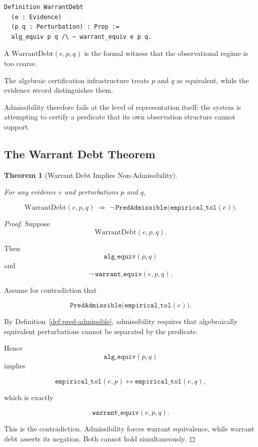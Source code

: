 \documentclass[12pt]{article}
\theoremstyle{plain}
\newtheorem{theorem}{Theorem}[section]
\theoremstyle{definition}
\theoremstyle{remark}
\newcommand{\WD}{\mathrm{WarrantDebt}}
\begin{document}
\begin{lstlisting}[style=rocq,
caption={Warrant debt.}]
Definition WarrantDebt
  (e : Evidence)
  (p q : Perturbation) : Prop :=
  alg_equiv p q /\ ~ warrant_equiv e p q.
\end{lstlisting}

A $\WD(e,p,q)$ is the formal witness that the observational regime is
too coarse.

The algebraic certification infrastructure treats $p$ and $q$ as
equivalent, while the evidence record distinguishes them.

Admissibility therefore fails at the level of representation itself:
the system is attempting to certify a predicate that its own
observation structure cannot support.

\subsection{The Warrant Debt Theorem}
\label{subsec:wdt}

\begin{theorem}[Warrant Debt Implies Non-Admissibility]
\label{thm:wdt}

For any evidence $e$ and perturbations $p$ and $q$,

\[
\WD(e,p,q)
\;\Rightarrow\;
\neg\,
\mathtt{PredAdmissible}
\bigl(
\mathtt{empirical\_tol}(e)
\bigr).
\]

\end{theorem}

\begin{proof}

Suppose
\[
\WD(e,p,q).
\]

Then
\[
\mathtt{alg\_equiv}(p,q)
\]
and
\[
\neg\,\mathtt{warrant\_equiv}(e,p,q).
\]

Assume for contradiction that

\[
\mathtt{PredAdmissible}
\bigl(
\mathtt{empirical\_tol}(e)
\bigr).
\]

By Definition~\ref{def:pred-admissible}, admissibility requires that
algebraically equivalent perturbations cannot be separated by the
predicate.

Hence
\[
\mathtt{alg\_equiv}(p,q)
\]
implies

\[
\mathtt{empirical\_tol}(e,p)
\leftrightarrow
\mathtt{empirical\_tol}(e,q),
\]

which is exactly

\[
\mathtt{warrant\_equiv}(e,p,q).
\]

This is the contradiction.
Admissibility forces warrant equivalence, while warrant debt asserts
its negation.
Both cannot hold simultaneously.

\end{proof}
\end{document}
